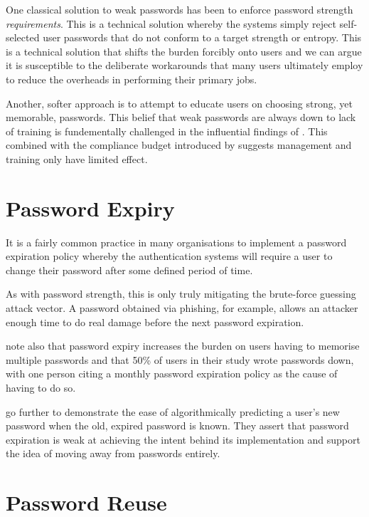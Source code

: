 \documentclass{report}
\begin{document}
One classical solution to weak passwords
has been to enforce password strength \emph{requirements}.
This is a technical solution whereby the systems simply
reject self-selected user passwords that do not conform
to a target strength or entropy.
This is a technical solution that shifts the burden forcibly onto
users and we can argue it is susceptible to the deliberate workarounds
that many users ultimately employ to reduce the overheads
in performing their primary jobs.

Another, softer approach is to attempt to educate users
on choosing strong, yet memorable, passwords. This belief
that weak passwords are always down to lack of training
is fundementally challenged in the influential findings
of \textcite{adams1999users}. This combined with the
compliance budget introduced by \textcite{beautement2009compliance}
suggests management and training only have limited effect.

\section{Password Expiry}

It is a fairly common practice in many organisations to
implement a password expiration policy whereby the
authentication systems will require a user to change their
password after some defined period of time.

As with password strength, this is only truly mitigating the
brute-force guessing attack vector. A password obtained via
phishing, for example, allows an attacker enough time to do
real damage before the next password expiration.

\textcite{adams1999users} note also that password expiry increases
the burden on users having to memorise multiple passwords and that
50\% of users in their study wrote passwords down, with one
person citing a monthly password expiration policy as the cause
of having to do so.

\textcite{zhang2010security} go further to demonstrate the ease of
algorithmically predicting a user's new password when the old,
expired password is known. They assert that password expiration
is weak at achieving the intent behind its implementation and
support the idea of moving away from passwords entirely.

\section{Password Reuse}
\end{document}
